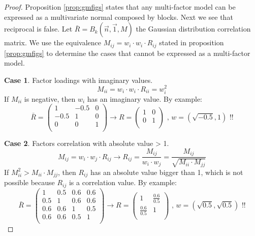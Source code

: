 \documentclass[11pt,fleqn]{book} %
\begin{document}
\begin{proof}
	Proposition \ref{prop:gmfigs} states that any multi-factor model 
	can be expressed as a multivariate normal composed by blocks.
	Next we see that reciprocal is false. Let 
	$\bar{R} = B_k(\vec{n},\vec{1},M)$ the Gaussian distribution 
	correlation matrix. We use the equivalence 
	$M_{ij} = w_i \cdot w_i \cdot R_{ij}$ stated in proposition 
	\ref{prop:gmfigs} to determine the cases that cannot be expressed 
	as a multi-factor model.

	\textbf{Case 1}. Factor loadings with imaginary values.
	\begin{displaymath}
		M_{ii} = w_i \cdot w_i \cdot R_{ii} = w_i^2
	\end{displaymath}
	If $M_{ii}$ is negative, then $w_i$ has an imaginary value.
	By example:
	\begin{displaymath}
		\bar{R} = \left(
		\begin{array}{cc|c}
			1    & -0.5 & 0 \\
			-0.5 & 1    & 0 \\
			\hline
			0    & 0    & 1 \\
		\end{array}
		\right) 
		\longrightarrow
		R = \left(
		\begin{array}{cc}
			1 & 0 \\
			0 & 1 \\
		\end{array}
		\right)
		\text{ , }
		w = (\sqrt{-0.5}, 1)
		\text{ !!}
	\end{displaymath}
	
	\textbf{Case 2}. Factors correlation with absolute value > 1.
	\begin{displaymath}
		M_{ij} = w_i \cdot w_j \cdot R_{ij} \longrightarrow 
		R_{ij} = \frac{M_{ij}}{w_i \cdot w_j} = 
		\frac{M_{ij}}{\sqrt{M_{ii} \cdot M_{jj}}}
	\end{displaymath}
	If $M_{ii}^2 > M_{ii} \cdot M_{jj}$, then $R_{ij}$ has an absolute value
	bigger than 1, which is not possible because $R_{ij}$ is a correlation
	value. By example:
	\begin{displaymath}
		\bar{R} = \left(
		\begin{array}{cc|cc}
			1   & 0.5 & 0.6 & 0.6 \\
			0.5 & 1   & 0.6 & 0.6 \\
			\hline
			0.6 & 0.6 & 1   & 0.5 \\
			0.6 & 0.6 & 0.5 & 1   \\
		\end{array}
		\right) 
		\longrightarrow
		R = \left(
		\begin{array}{cc}
			1               & \frac{0.6}{0.5} \\
			\frac{0.6}{0.5} & 1               \\
		\end{array}
		\right)
		\text{ , }
		w = (\sqrt{0.5}, \sqrt{0.5})
		\text{ !!}
	\end{displaymath}
\end{proof}
\end{document}
